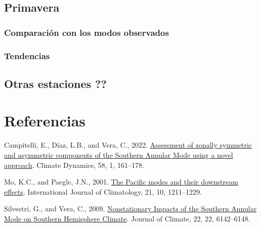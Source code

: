 \documentclass[12pt,oneside]{reedthesis}
\newlength{\cslhangindent}
\newenvironment{CSLReferences}[2] %
 {%
  \setlength{\parindent}{0pt}
  \ifodd #1 \everypar{\setlength{\hangindent}{\cslhangindent}}\ignorespaces\fi
  \ifnum #2 > 0
  \setlength{\parskip}{#2\baselineskip}
  \fi
 }%
 {}
\begin{document}
\hypertarget{primavera-1}{%
\section{Primavera}\label{primavera-1}}

\hypertarget{comparaciuxf3n-con-los-modos-observados}{%
\subsection{Comparación con los modos observados}\label{comparaciuxf3n-con-los-modos-observados}}

\hypertarget{tendencias}{%
\subsection{Tendencias}\label{tendencias}}

\hypertarget{otras-estaciones-1}{%
\section{Otras estaciones ??}\label{otras-estaciones-1}}

\backmatter

\hypertarget{referencias}{%
\chapter*{Referencias}\label{referencias}}


\noindent

\setlength{\parindent}{-0.20in}

\hypertarget{refs}{}
\begin{CSLReferences}{1}{0}
\leavevmode{}%
Campitelli, E., Díaz, L.B., and Vera, C., 2022. \href{https://doi.org/10.1007/s00382-021-05896-5}{Assessment of zonally symmetric and asymmetric components of the {Southern Annular Mode} using a novel approach}. Climate Dynamics, 58, 1, 161--178.

\leavevmode{}%
Mo, K.C., and Paegle, J.N., 2001. \href{https://doi.org/10.1002/joc.685}{The {Pacific} modes and their downstream effects}. International Journal of Climatology, 21, 10, 1211--1229.

\leavevmode{}%
Silvestri, G., and Vera, C., 2009. \href{https://doi.org/10.1175/2009JCLI3036.1}{Nonstationary {Impacts} of the {Southern Annular Mode} on {Southern Hemisphere Climate}}. Journal of Climate, 22, 22, 6142--6148.

\end{CSLReferences}

\end{document}
